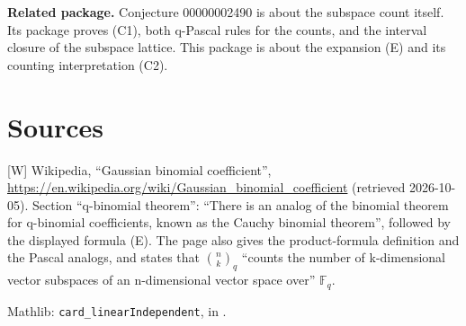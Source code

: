 \documentclass[11pt]{article}
\theoremstyle{definition}
\newcommand{\F}{\mathbb{F}}
\begin{document}
\textbf{Related package.} Conjecture 00000002490 is about the subspace count itself. Its
package proves (C1), both q-Pascal rules for the counts, and the interval closure of the
subspace lattice. This package is about the expansion (E) and its counting interpretation (C2).

\section*{Sources}
[W] Wikipedia, ``Gaussian binomial coefficient'',
\url{https://en.wikipedia.org/wiki/Gaussian_binomial_coefficient} (retrieved 2026-10-05).
Section ``q-binomial theorem'': ``There is an analog of the binomial theorem for q-binomial
coefficients, known as the Cauchy binomial theorem'', followed by the displayed formula (E). The
page also gives the product-formula definition and the Pascal analogs, and states that
$\binom nk_q$ ``counts the number of k-dimensional vector subspaces of an n-dimensional vector
space over'' $\F_q$.

Mathlib: \texttt{card\_linearIndependent}, in
.
\end{document}
